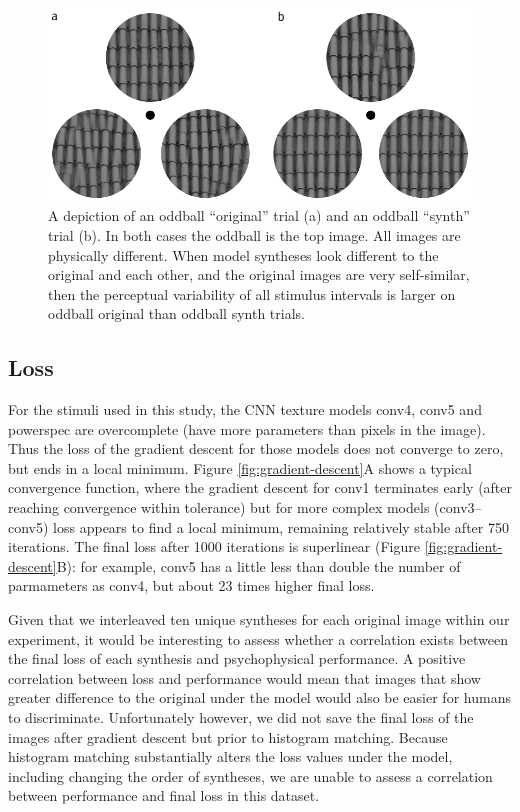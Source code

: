\documentclass[article, 11pt,a4paper,natbib]{apa6}\usepackage[]{graphicx}\usepackage[]{color}
\begin{document}
\begin{figure}
\centering
\includegraphics[scale=1]{oddball_asymmetry.pdf}
\caption{
A depiction of an oddball ``original'' trial (a) and an oddball ``synth'' trial (b). 
In both cases the oddball is the top image.
All images are physically different.
When model syntheses look different to the original and each other, and the original images are very self-similar, then the perceptual variability of all stimulus intervals is larger on oddball original than oddball synth trials.
}
\label{fig:oddball-demo}
\end{figure}


\subsection{Loss}



For the stimuli used in this study, the CNN texture models conv4, conv5 and powerspec are overcomplete (have more parameters than pixels in the image). 
Thus the loss of the gradient descent for those models does not converge to zero, but ends in a local minimum.
Figure \ref{fig:gradient-descent}A shows a typical convergence function, where the gradient descent for conv1 terminates early (after reaching convergence within tolerance) but for more complex models (conv3--conv5) loss appears to find a local minimum, remaining relatively stable after 750 iterations.
The final loss after 1000 iterations is superlinear (Figure \ref{fig:gradient-descent}B): for example, conv5 has a little less than double the number of parmameters as conv4, but about 23 times higher final loss.

Given that we interleaved ten unique syntheses for each original image within our experiment, it would be interesting to assess whether a correlation exists between the final loss of each synthesis and psychophysical performance.
A positive correlation between loss and performance would mean that images that show greater difference to the original under the model would also be easier for humans to discriminate.
Unfortunately however, we did not save the final loss of the images after gradient descent but prior to histogram matching.
Because histogram matching substantially alters the loss values under the model, including changing the order of syntheses, we are unable to assess a correlation between performance and final loss in this dataset. 
\end{document}
